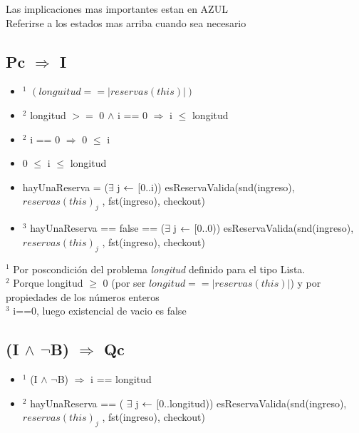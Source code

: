 \small Las implicaciones mas importantes estan en \textcolor{NavyBlue}{AZUL}\\
\small Referirse a los estados mas arriba cuando sea necesario\\
\vspace{2mm}

\subsection{Pc $ \Rightarrow $ I}
\begin{itemize}
	\item $ ^1 $ \textcolor{NavyBlue}{$(longuitud == |reservas(this)|)$} \checkmark
	\item $ ^2 $ longitud $ >= $ 0  $ \land $ i == 0 $ \Rightarrow $ i $ \leq $ longitud
	\item $ ^2 $ i == 0  $ \Rightarrow $ 0 $ \leq $ i
	\item \textcolor{NavyBlue}{0 $ \leq $ i $ \leq $ longitud} \checkmark
	\item hayUnaReserva = ($ \exists $ j $ \leftarrow $ [0..i)) esReservaValida(snd(ingreso), $ reservas(this)_j $ , fst(ingreso), checkout)
	\item $ ^3 $ \textcolor{NavyBlue}{hayUnaReserva == false == ($ \exists $ j $ \leftarrow $ [0..0)) esReservaValida(snd(ingreso), $ reservas(this)_j $ , fst(ingreso), checkout)} \checkmark
\end{itemize}
\vspace{3mm}

\noindent $ ^1 $ Por poscondición del problema \emph{longitud} definido para el tipo Lista.\\
$ ^2 $ Porque longitud $\geq$ 0 (por ser $longitud == |reservas(this)|$) y por propiedades de los números enteros\\
$ ^3 $ i==0, luego existencial de vacio es false\\

\subsection{(I $ \land $ $ \lnot $B) $ \Rightarrow $ Qc}
\begin{itemize}
	\item $ ^1 $ (I $ \land $ $ \lnot $B) $ \Rightarrow $ i == longitud
	\item $ ^2 $ \textcolor{NavyBlue}{ hayUnaReserva == ( $ \exists $ j $ \leftarrow $ [0..longitud)) esReservaValida(snd(ingreso), $ reservas(this)_j $ , fst(ingreso), checkout)} \checkmark
\end{itemize}
\vspace{3mm}

